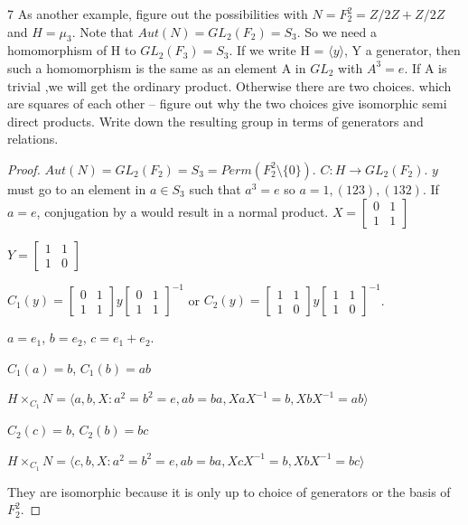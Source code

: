 \documentclass{article}
\begin{document}
\begin{PROB}{7}\label{Problem 7.}
    As another example, figure out the possibilities with $N = F_2^2 = Z/2Z + Z/2Z$ and $H = \mu_3$.  Note that $Aut(N) = GL_2(F_2) = S_3$.  So we need a homomorphism of H to $GL_2(F_3) = S_3$. If we write H = $\langle y \rangle$, Y a generator, then such a homomorphism is the same as an element A in $GL_2$ with $A^3 = e$.  If A is trivial ,we will get the ordinary product. Otherwise there are two choices. which are squares of each other -- figure out why the two choices give isomorphic semi direct products.  Write down the resulting group in terms of generators and relations. 
\end{PROB}
\begin{proof}
    $Aut(N) = GL_2(F_2) = S_3 = Perm(F_2^2\setminus\{0\})$. $C: H \to GL_2(F_2)$. $y$ must go to an element in $a \in S_3$ such that $a^3 = e$ so $a = 1, (1 2 3), (1 3 2)$. If $a = e$, conjugation by a would result in a normal product. 
    $X = \begin{bmatrix}
        0 & 1 \\ 1 & 1
    \end{bmatrix}$

    $Y = \begin{bmatrix}
        1 & 1 \\ 1 & 0
    \end{bmatrix}$
    
    $C_1(y) = \begin{bmatrix}
        0 & 1 \\ 1 & 1
    \end{bmatrix}y\begin{bmatrix}
    0 & 1 \\ 1 & 1
\end{bmatrix}^{-1}$ or $C_2(y) = \begin{bmatrix}
        1 & 1 \\ 1 & 0
    \end{bmatrix}y\begin{bmatrix}
        1 & 1 \\ 1 & 0
    \end{bmatrix}^{-1}$. 

    $a = e_1$, $b = e_2$, $c = e_1 + e_2$. 

    $C_1(a) = b$, $C_1(b) = ab$

    $H \times_{C_1} N = \langle a, b, X : a^2 = b^2 = e, ab = ba, XaX^{-1} = b, XbX^{-1} = ab \rangle$

    $C_2(c) = b$, $C_2(b) = bc$

    $H \times_{C_1} N = \langle c, b, X : a^2 = b^2 = e, ab = ba, XcX^{-1} = b, XbX^{-1} = bc \rangle$

    They are isomorphic because it is only up to choice of generators or the basis of $F_2^2$.
\end{proof}
\end{document}
